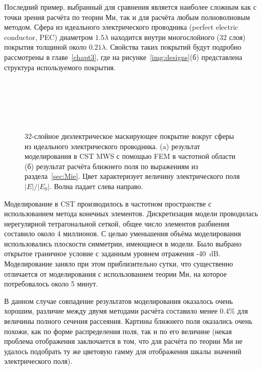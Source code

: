 Последний пример, выбранный для сравнения является наиболее сложным
как с точки зрения расчёта по теории Ми, так и для расчёта любым
полноволновым методом. Сфера из идеального электрического проводника
(perfect electric conductor, PEC) диаметром $1.5\lambda$ находится
внутри многослойного (32 слоя) покрытия толщиной около
$0.21\lambda$. Свойства таких покрытий будут подробно рассмотрены в
главе~\ref{chapt3}, где на рисунке~\ref{img:designs}(б) представлена
структура используемого покрытия. 
\begin{figure}[p] %
  \begin{minipage}[ht]{0.99\linewidth}        
  \end{minipage}\\
  \vfill
  \begin{minipage}[ht]{0.99\linewidth}        
  \end{minipage}\\
  \vfill
  \begin{minipage}[ht]{0.95\linewidth}
  \end{minipage}\\
  \vfill
  \begin{minipage}[ht]{0.99\linewidth}
  \end{minipage}
  \caption{32-слойное диэлектрическое маскирующее покрытие вокруг
    сферы из идеального электрического проводника. (a) результат моделирования в CST
    MWS с помощью FEM  в частотной области (б)
    результат расчёта ближнего поля по выражениям из
    раздела~\ref{sec:Mie}. Цвет характеризует величину электрического
    поля $|E|/|E_0|$. Волна падает слева направо.\label{img:e32layer}}
\end{figure}

Моделирование в CST производилось в частотном пространстве с
использованием метода конечных элементов. Дискретизация модели
проводилась нерегулярной тетрагональной сеткой, общее число элементов
разбиения составило около 4 миллионов.  С целью уменьшения объёма
моделирования использовались плоскости симметрии, имеющиеся в
модели. Было выбрано открытое граничное условие с заданным уровнем
отражения -40~dB. Моделирование заняло при этом приблизительно сутки,
что существенно отличается от моделирования с использованием теории
Ми, на которое потребовалось около 5 минут. 

В данном случае совпадение результатов моделирования оказалось очень
хорошим, различие между двумя методами расчёта составило менее 0.4\% 
для величины полного сечения рассеяния. Картины ближнего поля оказались очень похожи, как по форме распределения поля, так и по его
величине (некая проблема отображения заключается в том, что для
расчёта по теории Ми не удалось подобрать ту же цветовую гамму для
отображения шкалы значений электрического поля).

